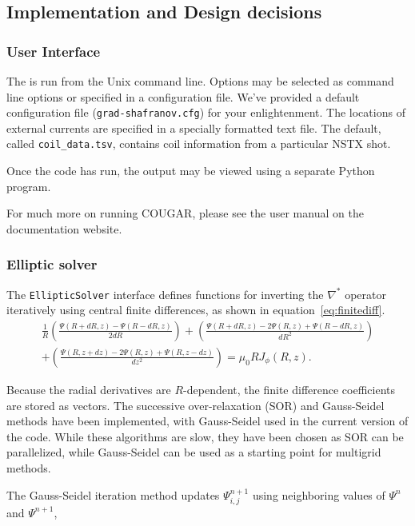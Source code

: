 \documentclass[paper=letter, fontsize=11pt]{scrartcl} %
\begin{document}
\restoregeometry

\subsection{Implementation and Design decisions}

\subsubsection{User Interface}
The is run from the Unix command line.  Options may be selected as command line options or specified in a configuration file.  We've provided a default configuration file (\texttt{grad-shafranov.cfg}) for your enlightenment.  The locations of external currents are specified in a specially formatted text file.  The default, called \texttt{coil\_data.tsv}, contains coil information from a particular NSTX shot.  

Once the code has run, the output may be viewed using a separate Python program.

For much more on running COUGAR, please see the user manual on the documentation website.

\subsubsection{Elliptic solver}
The \texttt{EllipticSolver} interface defines functions for inverting the $\nabla^*$ operator iteratively using central finite differences, as shown in equation~\ref{eq:finitediff}.
\begin{multline} \label{eq:finitediff}
\frac{1}{R} \left(\frac{\Psi(R + dR, z) - \Psi(R - dR, z)}{2dR} \right) + \left( \frac{\Psi (R + dR, z) - 2\Psi(R,z) + \Psi(R-dR, z)}{dR^2} \right) \\ + \left(\frac{\Psi(R, z + dz) - 2\Psi(R,z)  + \Psi(R, z-dz)}{dz^2}\right) = \mu_0 R J_{\phi}(R,z). 
\end{multline}

Because the radial derivatives are $R$-dependent, the finite difference coefficients are stored as vectors. The successive over-relaxation (SOR) and Gauss-Seidel methods have been implemented, with Gauss-Seidel used in the current version of the code. While these algorithms are slow, they have been chosen as SOR can be parallelized, while Gauss-Seidel can be used as a starting point for multigrid methods. 

The Gauss-Seidel iteration method updates $\Psi^{n+1}_{i,j}$ using neighboring values of $\Psi^{n}$ and $\Psi^{n+1}$, 
\end{document}
